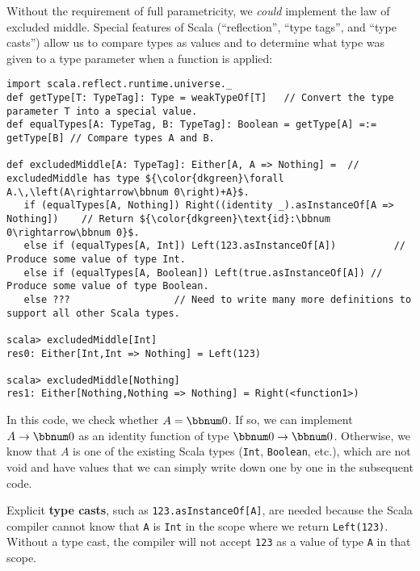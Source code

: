 Without the requirement of full parametricity, we \emph{could} implement
the law of excluded middle. Special
features of Scala (\textsf{``}reflection\textsf{''}, \textsf{``}type tags\textsf{''}, and \textsf{``}type
casts\textsf{''}) allow us to compare types as values and to determine what
type was given to a type parameter when a function is applied:
\begin{lstlisting}[mathescape=true]
import scala.reflect.runtime.universe._
def getType[T: TypeTag]: Type = weakTypeOf[T]   // Convert the type parameter T into a special value.
def equalTypes[A: TypeTag, B: TypeTag]: Boolean = getType[A] =:= getType[B] // Compare types A and B.

def excludedMiddle[A: TypeTag]: Either[A, A => Nothing] =  // excludedMiddle has type ${\color{dkgreen}\forall A.\,\left(A\rightarrow\bbnum 0\right)+A}$.
   if (equalTypes[A, Nothing]) Right((identity _).asInstanceOf[A => Nothing])    // Return ${\color{dkgreen}\text{id}:\bbnum 0\rightarrow\bbnum 0}$.
   else if (equalTypes[A, Int]) Left(123.asInstanceOf[A])          // Produce some value of type Int.
   else if (equalTypes[A, Boolean]) Left(true.asInstanceOf[A]) // Produce some value of type Boolean.
   else ???                  // Need to write many more definitions to support all other Scala types.

scala> excludedMiddle[Int]
res0: Either[Int,Int => Nothing] = Left(123)

scala> excludedMiddle[Nothing]
res1: Either[Nothing,Nothing => Nothing] = Right(<function1>) 
\end{lstlisting}
In this code, we check whether $A=\bbnum 0$. If so, we can implement
$A\rightarrow\bbnum 0$ as an identity function of type $\bbnum 0\rightarrow\bbnum 0$.
Otherwise, we know that $A$ is one of the existing Scala types (\lstinline!Int!,
\lstinline!Boolean!, etc.), which are not void and have values that
we can simply write down one by one in the subsequent code. 

Explicit \textbf{type casts}, such as \lstinline!123.asInstanceOf[A]!,
are needed because the Scala compiler cannot know that \lstinline!A!
is \lstinline!Int! in the scope where we return \lstinline!Left(123)!.
Without a type cast, the compiler will not accept \lstinline!123!
as a value of type \lstinline!A! in that scope.

